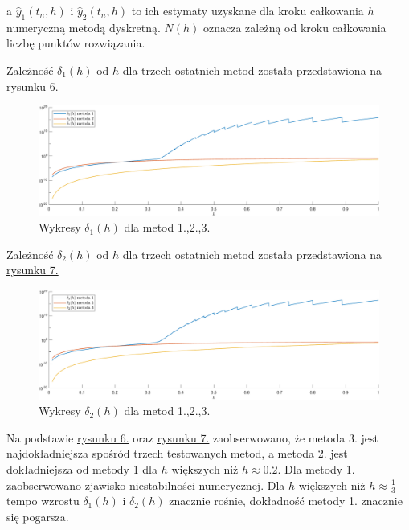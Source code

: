 \documentclass[a4paper, 12pt, twoside, openany]{article}
\begin{document}
    a $\hat{y}_1(t_n,h)$ i $\hat{y}_2(t_n,h)$ to ich estymaty uzyskane dla kroku całkowania $h$ numeryczną metodą dyskretną.
    $N(h)$ oznacza zależną od kroku całkowania liczbę punktów rozwiązania.
    \\\par\noindent
    Zależność $ \delta_1(h) $ od $h$ dla trzech ostatnich metod została przedstawiona na \hyperref[fig:delta1]{rysunku 6.}
    \begin{figure}[h]
        \centering
        \label{fig:delta1}
        \includegraphics[width=\linewidth]{delta1new.pdf}
        \caption{Wykresy $\delta_1(h)$ dla metod 1.,2.,3. }
    \end{figure}
    \newpage
    \noindent
    Zależność $ \delta_2(h) $ od $h$ dla trzech ostatnich metod została przedstawiona na \hyperref[fig:delta2]{rysunku 7.}
    \begin{figure}[H]
        \centering
        \label{fig:delta2}
        \includegraphics[width=\linewidth]{delta2new.pdf}
        \caption{Wykresy $\delta_2(h)$ dla metod 1.,2.,3. }
    \end{figure}

    \noindent
    Na podstawie \hyperref[fig:delta1]{rysunku 6.} oraz \hyperref[fig:delta2]{rysunku 7.} zaobserwowano,
    że metoda 3. jest najdokładniejsza spośród trzech testowanych metod,
    a metoda 2. jest dokładniejsza od metody 1 dla $h$ większych niż $h \approx 0.2$.
    Dla metody 1. zaobserwowano zjawisko niestabilności numerycznej.
    Dla $h$ większych niż $h \approx \frac{1}{3}$ tempo wzrostu $\delta_1(h)$ i $\delta_2(h)$ znacznie rośnie, dokładność metody 1. znacznie się pogarsza.
\end{document}
